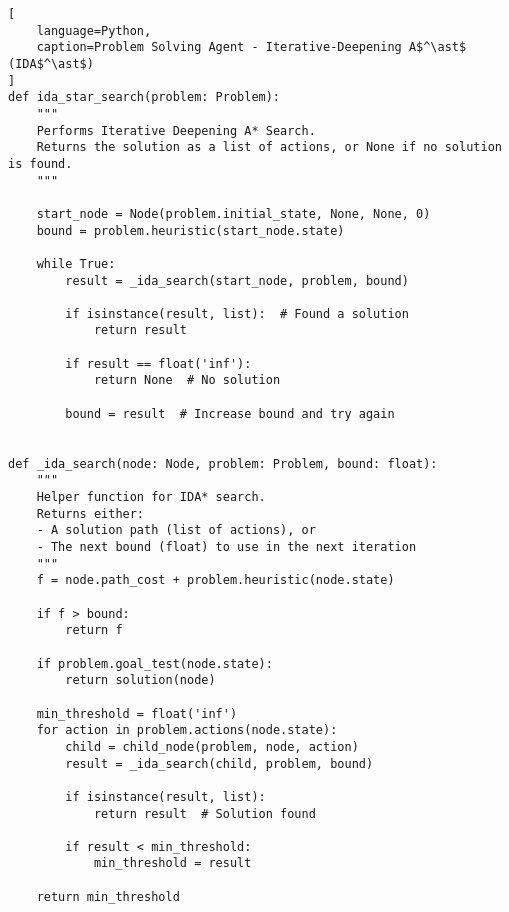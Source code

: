 \begin{lstlisting}[
    language=Python,
    caption=Problem Solving Agent - Iterative-Deepening A$^\ast$ (IDA$^\ast$)
]
def ida_star_search(problem: Problem):
    """
    Performs Iterative Deepening A* Search.
    Returns the solution as a list of actions, or None if no solution is found.
    """

    start_node = Node(problem.initial_state, None, None, 0)
    bound = problem.heuristic(start_node.state)

    while True:
        result = _ida_search(start_node, problem, bound)

        if isinstance(result, list):  # Found a solution
            return result

        if result == float('inf'):
            return None  # No solution

        bound = result  # Increase bound and try again


def _ida_search(node: Node, problem: Problem, bound: float):
    """
    Helper function for IDA* search.
    Returns either:
    - A solution path (list of actions), or
    - The next bound (float) to use in the next iteration
    """
    f = node.path_cost + problem.heuristic(node.state)

    if f > bound:
        return f

    if problem.goal_test(node.state):
        return solution(node)

    min_threshold = float('inf')
    for action in problem.actions(node.state):
        child = child_node(problem, node, action)
        result = _ida_search(child, problem, bound)

        if isinstance(result, list):
            return result  # Solution found

        if result < min_threshold:
            min_threshold = result

    return min_threshold
\end{lstlisting}











